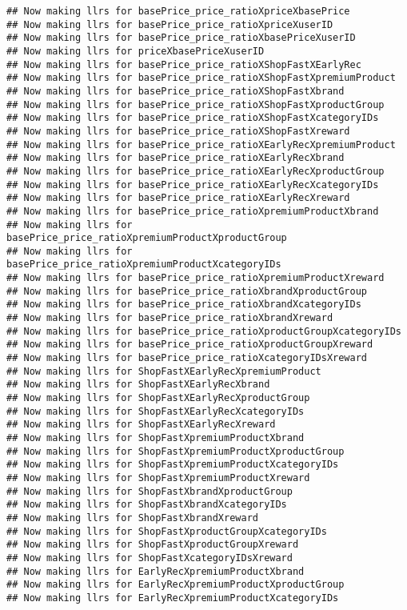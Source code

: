 \documentclass[10pt]{report}
\begin{document}
\begin{verbatim}
## Now making llrs for basePrice_price_ratioXpriceXbasePrice
## Now making llrs for basePrice_price_ratioXpriceXuserID
## Now making llrs for basePrice_price_ratioXbasePriceXuserID
## Now making llrs for priceXbasePriceXuserID
## Now making llrs for basePrice_price_ratioXShopFastXEarlyRec
## Now making llrs for basePrice_price_ratioXShopFastXpremiumProduct
## Now making llrs for basePrice_price_ratioXShopFastXbrand
## Now making llrs for basePrice_price_ratioXShopFastXproductGroup
## Now making llrs for basePrice_price_ratioXShopFastXcategoryIDs
## Now making llrs for basePrice_price_ratioXShopFastXreward
## Now making llrs for basePrice_price_ratioXEarlyRecXpremiumProduct
## Now making llrs for basePrice_price_ratioXEarlyRecXbrand
## Now making llrs for basePrice_price_ratioXEarlyRecXproductGroup
## Now making llrs for basePrice_price_ratioXEarlyRecXcategoryIDs
## Now making llrs for basePrice_price_ratioXEarlyRecXreward
## Now making llrs for basePrice_price_ratioXpremiumProductXbrand
## Now making llrs for basePrice_price_ratioXpremiumProductXproductGroup
## Now making llrs for basePrice_price_ratioXpremiumProductXcategoryIDs
## Now making llrs for basePrice_price_ratioXpremiumProductXreward
## Now making llrs for basePrice_price_ratioXbrandXproductGroup
## Now making llrs for basePrice_price_ratioXbrandXcategoryIDs
## Now making llrs for basePrice_price_ratioXbrandXreward
## Now making llrs for basePrice_price_ratioXproductGroupXcategoryIDs
## Now making llrs for basePrice_price_ratioXproductGroupXreward
## Now making llrs for basePrice_price_ratioXcategoryIDsXreward
## Now making llrs for ShopFastXEarlyRecXpremiumProduct
## Now making llrs for ShopFastXEarlyRecXbrand
## Now making llrs for ShopFastXEarlyRecXproductGroup
## Now making llrs for ShopFastXEarlyRecXcategoryIDs
## Now making llrs for ShopFastXEarlyRecXreward
## Now making llrs for ShopFastXpremiumProductXbrand
## Now making llrs for ShopFastXpremiumProductXproductGroup
## Now making llrs for ShopFastXpremiumProductXcategoryIDs
## Now making llrs for ShopFastXpremiumProductXreward
## Now making llrs for ShopFastXbrandXproductGroup
## Now making llrs for ShopFastXbrandXcategoryIDs
## Now making llrs for ShopFastXbrandXreward
## Now making llrs for ShopFastXproductGroupXcategoryIDs
## Now making llrs for ShopFastXproductGroupXreward
## Now making llrs for ShopFastXcategoryIDsXreward
## Now making llrs for EarlyRecXpremiumProductXbrand
## Now making llrs for EarlyRecXpremiumProductXproductGroup
## Now making llrs for EarlyRecXpremiumProductXcategoryIDs

\end{verbatim}
\end{document}
